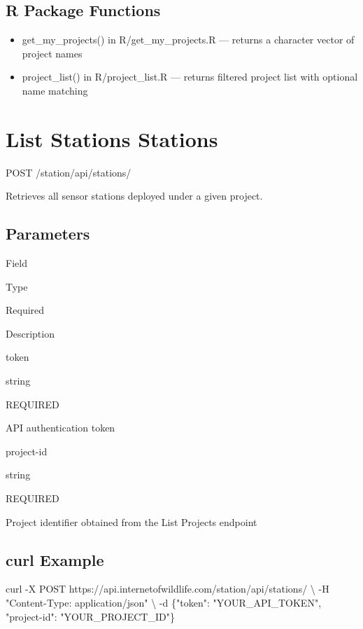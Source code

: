 \documentclass[
]{book}
\newenvironment{Shaded}{\begin{snugshade}}{\end{snugshade}}
\newcommand{\AttributeTok}[1]{\textcolor[rgb]{0.13,0.29,0.53}{#1}}
\newcommand{\DataTypeTok}[1]{\textcolor[rgb]{0.13,0.29,0.53}{#1}}
\newcommand{\ExtensionTok}[1]{#1}
\newcommand{\NormalTok}[1]{#1}
\newcommand{\StringTok}[1]{\textcolor[rgb]{0.31,0.60,0.02}{#1}}
\providecommand{\tightlist}{%
  \setlength{\itemsep}{0pt}\setlength{\parskip}{0pt}}
\begin{document}
\subsection{R Package Functions}\label{r-package-functions}

\begin{itemize}
\tightlist
\item
  get\_my\_projects() in R/get\_my\_projects.R --- returns a character vector of project names
\item
  project\_list() in R/project\_list.R --- returns filtered project list with optional name matching
\end{itemize}

\section{\texorpdfstring{List Stations {Stations}}{List Stations Stations}}\label{list-stations-stations}

{POST}
{/station/api/stations/}

Retrieves all sensor stations deployed under a given project.

\subsection{Parameters}\label{parameters-1}

Field

Type

Required

Description

token

{string}

{REQUIRED}

API authentication token

project-id

{string}

{REQUIRED}

Project identifier obtained from the List Projects endpoint

\subsection{curl Example}\label{curl-example-1}

\begin{Shaded}
\begin{Highlighting}[]
\ExtensionTok{curl} \AttributeTok{{-}X}\NormalTok{ POST https://api.internetofwildlife.com/station/api/stations/ }\DataTypeTok{\textbackslash{}}
  \AttributeTok{{-}H} \StringTok{"Content{-}Type: application/json"} \DataTypeTok{\textbackslash{}}
  \AttributeTok{{-}d} \StringTok{\textquotesingle{}\{"token": "YOUR\_API\_TOKEN", "project{-}id": "YOUR\_PROJECT\_ID"\}\textquotesingle{}}
\end{Highlighting}
\end{Shaded}
\end{document}
